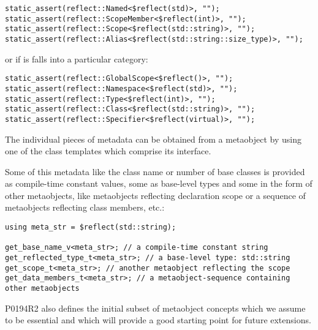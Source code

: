 \begin{verbatim}
static_assert(reflect::Named<$reflect(std)>, "");
static_assert(reflect::ScopeMember<$reflect(int)>, "");
static_assert(reflect::Scope<$reflect(std::string)>, "");
static_assert(reflect::Alias<$reflect(std::string::size_type)>, "");
\end{verbatim}

or if is falls into a particular category:

\begin{verbatim}
static_assert(reflect::GlobalScope<$reflect()>, "");
static_assert(reflect::Namespace<$reflect(std)>, "");
static_assert(reflect::Type<$reflect(int)>, "");
static_assert(reflect::Class<$reflect(std::string)>, "");
static_assert(reflect::Specifier<$reflect(virtual)>, "");
\end{verbatim}

The individual pieces of metadata can be obtained from a metaobject by using one
of the class templates which comprise its interface.

Some of this metadata like the class name or number of base classes is provided
as compile-time constant values, some as base-level types
and some in the form of other metaobjects, like metaobjects
reflecting declaration scope or a sequence of metaobjects reflecting class members,
etc.:

\begin{verbatim}
using meta_str = $reflect(std::string);

get_base_name_v<meta_str>; // a compile-time constant string
get_reflected_type_t<meta_str>; // a base-level type: std::string
get_scope_t<meta_str>; // another metaobject reflecting the scope
get_data_members_t<meta_str>; // a metaobject-sequence containing other metaobjects
\end{verbatim}

P0194R2 also defines the initial subset
of metaobject concepts which we assume to be essential
and which will provide a good starting point for future extensions.

